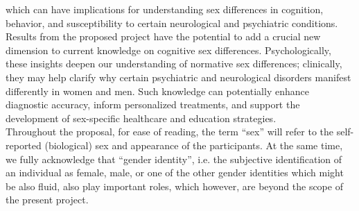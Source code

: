 \documentclass[11pt,a4paper]{article}
\begin{document}
which can have implications for understanding sex differences in cognition, behavior, and susceptibility to certain 
neurological and psychiatric conditions.\\
Results from the proposed project have the potential to add a crucial new dimension to current knowledge on 
cognitive sex differences. Psychologically, these insights deepen our understanding of normative sex differences; 
clinically, they may help clarify why certain psychiatric and neurological disorders manifest differently in women 
and men. Such knowledge can potentially enhance diagnostic accuracy, inform personalized treatments, and support the 
development of sex-specific healthcare and education strategies.\\
Throughout the proposal, for ease of reading, the term “sex” will refer to the self-reported (biological) sex and 
appearance of the participants. At the same time, we fully acknowledge that “gender identity”, i.e. the 
subjective identification of an individual as female, male, or one of the other gender identities which might 
be also fluid, also play important roles, which however, are beyond the scope of the present project. 


\printbibliography
\end{document}
